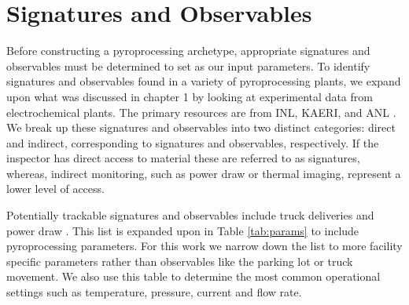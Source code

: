 \FloatBarrier

\section{Signatures and Observables}

Before constructing a pyroprocessing archetype, appropriate signatures and observables must be determined to set as our input parameters. To identify signatures and observables 
found in a variety of pyroprocessing plants, we expand upon what was discussed in chapter 1 by looking at experimental data from electrochemical plants. The primary resources are from 
INL, KAERI, and ANL \cite{lee_korean_2011,flowsheet_1998,michael_f._simpson_developments_2012,li_electrorefining_2005}. We break up these signatures and observables into two distinct categories: direct and indirect, corresponding to signatures and observables, respectively. If the inspector has direct access to material these are referred to as signatures, whereas, indirect monitoring, such as
power draw or thermal imaging, represent a lower level of access. 

Potentially trackable signatures and observables include truck deliveries and  power draw  \cite{Hou_2016,Yilmaz_2016}. This list is expanded upon in Table \ref{tab:params} to include pyroprocessing parameters. For this work we narrow down the list to more facility specific parameters rather than observables like the parking lot or truck movement. We also use this table
to determine the most common operational settings such as temperature, pressure, current and flow rate.

